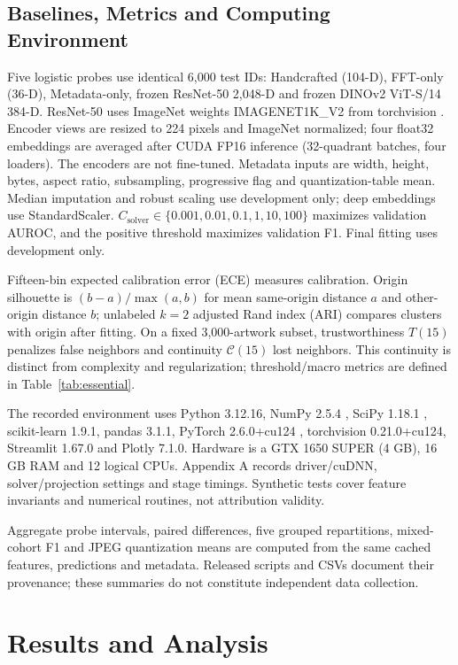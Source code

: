 \documentclass[journal,twoside,web]{IEEEtran}
\begin{document}
\subsection{Baselines, Metrics and Computing Environment}
Five logistic probes use identical 6,000 test IDs: Handcrafted (104-D), FFT-only (36-D), Metadata-only, frozen ResNet-50 \cite{resnet} 2,048-D and frozen DINOv2 \cite{dinov2} ViT-S/14 384-D. ResNet-50 uses ImageNet \cite{imagenet} weights IMAGENET1K\_V2 from torchvision \cite{torchvision}. Encoder views are resized to 224 pixels and ImageNet normalized; four float32 embeddings are averaged after CUDA FP16 inference (32-quadrant batches, four loaders). The encoders are not fine-tuned. Metadata inputs are width, height, bytes, aspect ratio, subsampling, progressive flag and quantization-table mean. Median imputation and robust scaling use development only; deep embeddings use StandardScaler. $C_{\mathrm{solver}}\in\{0.001,0.01,0.1,1,10,100\}$ maximizes validation AUROC, and the positive threshold maximizes validation F1. Final fitting uses development only.

Fifteen-bin expected calibration error (ECE) measures calibration. Origin silhouette \cite{silhouette} is $(b-a)/\max(a,b)$ for mean same-origin distance $a$ and other-origin distance $b$; unlabeled $k=2$ adjusted Rand index (ARI) compares clusters with origin after fitting. On a fixed 3,000-artwork subset, trustworthiness $T(15)$ \cite{venna} penalizes false neighbors and continuity $\mathcal{C}(15)$ lost neighbors. This continuity is distinct from complexity and regularization; threshold/macro metrics are defined in Table~\ref{tab:essential}.

The recorded environment uses Python 3.12.16, NumPy 2.5.4 \cite{numpy}, SciPy 1.18.1 \cite{scipy}, scikit-learn 1.9.1, pandas 3.1.1, PyTorch 2.6.0+cu124 \cite{pytorch}, torchvision 0.21.0+cu124, Streamlit 1.67.0 and Plotly 7.1.0. Hardware is a GTX 1650 SUPER (4 GB), 16 GB RAM and 12 logical CPUs. Appendix A records driver/cuDNN, solver/projection settings and stage timings. Synthetic tests cover feature invariants and numerical routines, not attribution validity.

Aggregate probe intervals, paired differences, five grouped repartitions, mixed-cohort F1 and JPEG quantization means are computed from the same cached features, predictions and metadata. Released scripts and CSVs document their provenance; these summaries do not constitute independent data collection.

\section{Results and Analysis}
\end{document}
